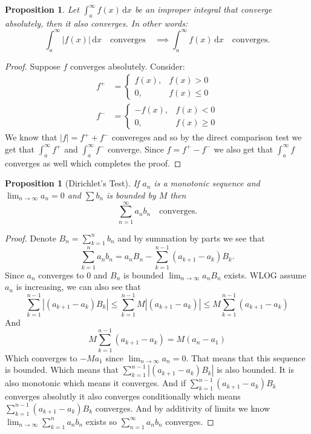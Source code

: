 \documentclass[11pt,a4paper]{article}
\theoremstyle{definition}
\theoremstyle{plain}
\newtheorem{proposition}[theorem]{Proposition}
\newcommand\dx    {\,\mathrm{d}x}
\newcommand{\abs}[1]{\left\lvert #1\right\rvert}
\begin{document}
  \begin{proposition}
    Let $\int_a^\infty f(x)\dx$ be an improper integral that 
    converge absolutely, then it also converges.
    In other words:
    \[
      \int_a^\infty \abs{f(x)}\dx \quad\mathrm{converges}\quad
      \implies
      \int_a^\infty {f(x)}\dx \quad\mathrm{converges}.
    \]
  \end{proposition}
  \begin{proof}
    Suppose $f$ converges absolutely. Consider:
    \begin{align*}
      f^+&=
      \begin{cases}
          f(x),  & f(x) > 0 \\
          0,  & f(x) \le 0
      \end{cases} \\
      f^-&=
      \begin{cases}
          -f(x),  & f(x) < 0 \\
          0,  & f(x) \ge 0
      \end{cases}
    \end{align*}
    We know that $\abs{f} = f^+ + f^-$ convereges and so by the direct 
    comparison test we get that  $\int_{a}^{\infty} f^+$ and 
    $\int_{a}^{\infty} f^-$ converge.
    Since $f = f^+ - f^-$ we also get that $\int_{a}^{\infty} f$ converges 
    as well which completes the proof.
  \end{proof}

  \begin{proposition}[Dirichlet's Test]
    If $a_n$ is a monotonic sequence and $\lim_{n\to\infty} a_n = 0$ and 
    $\sum b_n$ is bounded by $M$ then
    \[
      \sum_{n=1}^{\infty} a_n b_n \quad\mathrm{ converges}.
    \]
  \end{proposition}
  \begin{proof}
		Denote $B_{n} = \sum_{k=1}^{n}{b_{n}}$ and by summation by parts we see that
		\[
			\sum_{k=1}^{n}{a_{n}b_{n}} =
      a_{n}B_{n} - \sum_{k=1}^{n-1}{(a_{k+1}-a_{k})B_k}.
		\]
		Since $a_{n}$ converges to $0$ and $B_{n}$ is bounded 
		$\lim_{n\to\infty}{a_nB_n}$ exists.
		WLOG assume $a_n$ is increasing, we can also see that
		\[
    \sum_{k=1}^{n-1} \abs{(a_{k+1}-a_{k})B_k} \le
    \sum_{k=1}^{n-1} M\abs{(a_{k+1}-a_{k})} \le
			M \sum_{k=1}^{n-1}{(a_{k+1}-a_{k})}
		\] 
		And
		\[
			M \sum_{k=1}^{n-1}{(a_{k+1}-a_{k})} = M(a_{n}-a_{1})
		\]
		Which converges to $-Ma_1$ since $\lim_{n\to\infty}{a_n}=0$.
		That means that this sequence is bounded. Which means that
		$\sum_{k=1}^{n-1}{|(a_{k+1}-a_{k})B_k|}$ is also bounded.
		It is also monotonic which means it converges. And if
		$\sum_{k=1}^{n-1}{(a_{k+1}-a_{k})B_k}$ converges absolutly it also
		converges conditionally which means $\sum_{k=1}^{n-1}{(a_{k+1}-a_{k})B_k}$
		converges. And by additivity of limits we know 
		$\lim_{n\to\infty}\sum_{k=1}^{n}{a_{n}b_{n}}$ exists so 
		$\sum_{n=1}^\infty a_nb_n$ converges.
  \end{proof}
	
\end{document}

